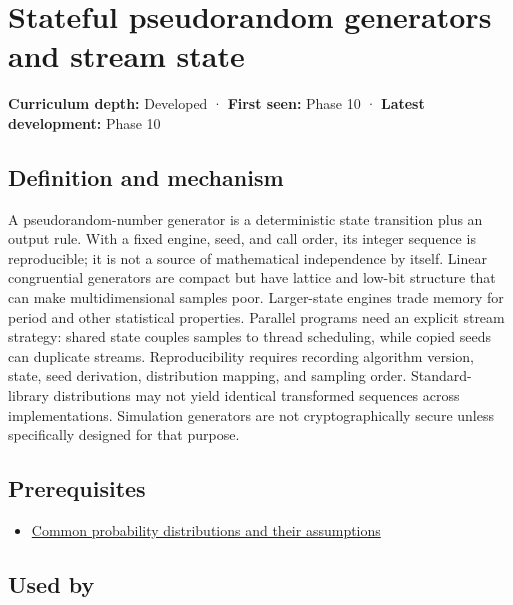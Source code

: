 \hypertarget{appendix-e0f7c7e08f3a}{}
\section{Stateful pseudorandom generators and stream state}\label{appendix-e0f7c7e08f3a-stateful-pseudorandom-generators-and-stream-state}

\textbf{Curriculum depth:} Developed · \textbf{First seen:} Phase 10 · \textbf{Latest development:} Phase 10

\subsection{Definition and mechanism}\label{appendix-e0f7c7e08f3a-definition-and-mechanism}

A pseudorandom-number generator is a deterministic state transition plus an output rule. With a fixed engine, seed, and call order, its integer sequence is reproducible; it is not a source of mathematical independence by itself. Linear congruential generators are compact but have lattice and low-bit structure that can make multidimensional samples poor. Larger-state engines trade memory for period and other statistical properties. Parallel programs need an explicit stream strategy: shared state couples samples to thread scheduling, while copied seeds can duplicate streams. Reproducibility requires recording algorithm version, state, seed derivation, distribution mapping, and sampling order. Standard-library distributions may not yield identical transformed sequences across implementations. Simulation generators are not cryptographically secure unless specifically designed for that purpose.

\subsection{Prerequisites}\label{appendix-e0f7c7e08f3a-prerequisites}

\begin{itemize}
\tightlist
\item
  \hyperref[appendix-a2360b435383]{Common probability distributions and their assumptions}
\end{itemize}

\subsection{Used by}\label{appendix-e0f7c7e08f3a-used-by}

